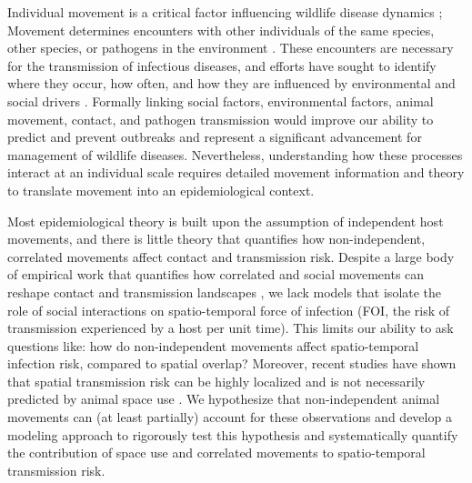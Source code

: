 \documentclass[letterpaper]{article}
\begin{document}
Individual movement is a critical factor influencing wildlife disease dynamics \citep{Dougherty2018,Manlove2022};
Movement determines encounters with other individuals of the same species, other species, or pathogens in the environment \citep{Martinez-Garcia2020,Das2023}. 
These encounters are necessary for the transmission of infectious diseases, and efforts have sought to identify where they occur, how often, and how they are influenced by environmental and social drivers \citep{Titcomb2021,Dougherty2022,Webber2023}. 
Formally linking social factors, environmental factors, animal movement, contact, and pathogen transmission would improve our ability to predict and prevent outbreaks and represent a significant advancement for management of wildlife diseases.  
Nevertheless, understanding how these processes interact at an individual scale requires detailed movement information and theory to translate movement into an epidemiological context.

Most epidemiological theory is built upon the assumption of independent host movements, and there is little theory that quantifies how non-independent, correlated movements affect contact and transmission risk. Despite a large body of empirical work that quantifies how correlated and social movements can reshape contact and transmission landscapes \citep[e.g.,][]{Kjaer2008,Grear2010,Schauber2015a}, we lack models that isolate the role of social interactions on spatio-temporal force of infection (FOI, the risk of transmission experienced by a host per unit time). This limits our ability to ask questions like: how do non-independent movements affect spatio-temporal infection risk, compared to spatial overlap?  Moreover, recent studies have shown that spatial transmission risk can be highly localized \citep{Albery2021} and is not necessarily predicted by animal space use \citep{Yang2023a}. We hypothesize that non-independent animal movements can (at least partially) account for these observations and develop a modeling approach to rigorously test this hypothesis and systematically quantify the contribution of space use and correlated movements to spatio-temporal transmission risk.
\end{document}
